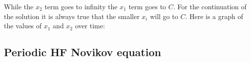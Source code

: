 \documentclass[english,master]{liumaiex}
\theoremstyle{plain}
\theoremstyle{definition}
\begin{document}
While the $x_2$ term goes to infinity the $x_1$ term goes to $C$. For the continuation of the solution it is always true that the smaller $x_i$ will go to $C$. Here is a graph of the values of $x_1$ and $x_2$ over time:

\begin{center}
\end{center}

\subsection{Periodic HF Novikov equation}
\end{document}
